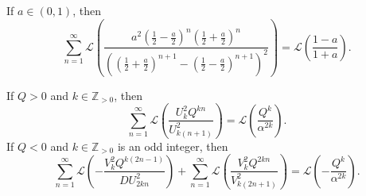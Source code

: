 \documentclass[10pt,a4paper]{amsart}
\begin{document}
\begin{corollary}\label{cor:main}
    If $a \in (0,1)$, then 
    \begin{equation*}
        \sum_{n=1}^{\infty}\mathcal{L}\left(\frac{a^2\left(\frac{1}{2}-\frac{a}{2}\right)^{n}\left(\frac{1}{2} + \frac{a}{2}\right)^{n}}{\left(\left(\frac{1}{2}+\frac{a}{2}\right)^{n+1}-\left(\frac{1}{2} - \frac{a}{2}\right)^{n+1}\right)^2}\right) = \mathcal{L}\left(\frac{1-a}{1+a}\right).
    \end{equation*}  
\end{corollary}

\begin{theorem}\label{thm:generalized_bridgeman}
    If $Q > 0$ and $k \in \mathbb{Z}_{>0}$, then
    \begin{equation}
        \sum_{n=1}^{\infty}\mathcal{L}\left(\frac{U^2_k Q^{kn}}{U^2_{k(n+1)}}\right) = \mathcal{L}\left(\frac{Q^k}{\alpha^{2k}}\right).\label{eq:lucas_series_pos}
    \end{equation}
    If $Q < 0$ and $k \in \mathbb{Z}_{>0}$ is an odd integer, then 
    \begin{equation}
       \sum_{n=1}^{\infty}\mathcal{L}\left(-\frac{V^2_k Q^{k(2n-1)}}{D U^2_{2kn} }\right) + \sum_{n=1}^{\infty}\mathcal{L}\left(\frac{V^2_k Q^{2kn}}{ V^2_{k(2n+1)}}\right) = \mathcal{L}\left(-\frac{Q^k}{\alpha^{2k}}\right).\label{eq:lucas_series_neg}
    \end{equation} 
\end{theorem}
\end{document}
